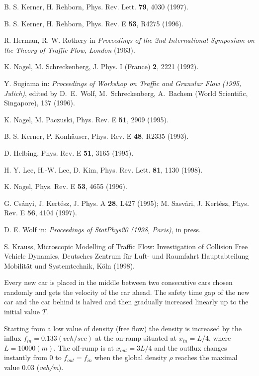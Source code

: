 \begin{references}

B. S. Kerner, H. Rehborn, Phys. Rev. Lett. {\bf 79}, 4030 (1997).

B. S. Kerner, H. Rehborn, Phys. Rev. E {\bf 53}, R4275 (1996).

R. Herman, R. W. Rothery in {\it Proceedings of the 2nd International
Symposium on the Theory of Traffic Flow, London} (1963).

K. Nagel, M. Schreckenberg, J. Phys. I (France) {\bf 2}, 2221 (1992).

Y. Sugiama in: {\it Proceedings of Workshop on Traffic and Granular Flow (1995,
Julich)}, edited by D.~E.~Wolf, M.~Schreckenberg, A.~Bachem (World
Scientific, Singapore), 137 (1996).

K. Nagel, M. Paczuski, Phys. Rev. E {\bf 51}, 2909 (1995).

B. S. Kerner, P. Konh\"{a}user, Phys. Rev. E {\bf 48}, R2335 (1993).

D. Helbing, Phys. Rev. E {\bf 51}, 3165 (1995).

H. Y. Lee, H.-W. Lee, D. Kim, Phys. Rev. Lett. {\bf 81}, 1130 (1998).

K. Nagel, Phys. Rev. E {\bf 53}, 4655 (1996).

G. Cs\'{a}nyi, J. Kert\'{e}sz, J. Phys. A {\bf 28}, L427 (1995); M.
Sasv\'{a}ri, J. Kert\'{e}sz, Phys. Rev. E {\bf 56}, 4104 (1997).

D. E. Wolf in: {\it Proceedings of StatPhys20 (1998, Paris)}, in press.

S. Krauss, Microscopic Modelling of Traffic Flow: Investigation of Collision
Free Vehicle Dynamics, Deutsches Zentrum f\"{u}r Luft- und Raumfahrt
Hauptabteilung Mobilit\"{a}t und Systemtechnik, K\"{o}ln (1998).

Every new car is placed in the middle between two consecutive
cars chosen randomly and gets the velocity of the car ahead. The safety time
gap of the new car and the car behind is halved and then gradually increased
linearly up to the initial value $T$.

Starting from
a low value of density (free flow) the density is increased by the influx
$f_{in}=0.133(veh/sec)$ at the on-ramp situated at $x_{in}=L/4$, where
$L=10000(m)$. The off-rump is at $x_{out}=3L/4$ and the outflux changes
instantly from 0 to $f_{out}=f_{in}$ when the global density $\rho$ reaches
the maximal value 0.03 ({\it veh/m}).

\end{references}

